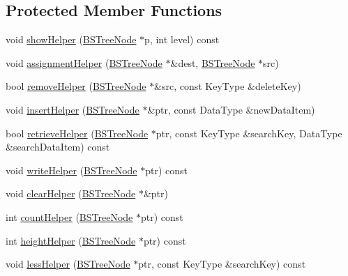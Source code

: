 \subsection*{\-Protected \-Member \-Functions}
\begin{DoxyCompactItemize}
\item 
void \hyperlink{class_b_s_tree_a44b3002e3476eb410468a4b9aaaa73ef}{show\-Helper} (\hyperlink{class_b_s_tree_1_1_b_s_tree_node}{\-B\-S\-Tree\-Node} $\ast$p, int level) const 
\item 
void \hyperlink{class_b_s_tree_aa0723f656b301d41e727f385d2ba2972}{assignment\-Helper} (\hyperlink{class_b_s_tree_1_1_b_s_tree_node}{\-B\-S\-Tree\-Node} $\ast$\&dest, \hyperlink{class_b_s_tree_1_1_b_s_tree_node}{\-B\-S\-Tree\-Node} $\ast$src)
\item 
bool \hyperlink{class_b_s_tree_ae6ebc1c4b8b1bba3f5e72f8d3700c79f}{remove\-Helper} (\hyperlink{class_b_s_tree_1_1_b_s_tree_node}{\-B\-S\-Tree\-Node} $\ast$\&src, const \-Key\-Type \&delete\-Key)
\item 
void \hyperlink{class_b_s_tree_ab3d09c9969cce52974a4a65e00202061}{insert\-Helper} (\hyperlink{class_b_s_tree_1_1_b_s_tree_node}{\-B\-S\-Tree\-Node} $\ast$\&ptr, const \-Data\-Type \&new\-Data\-Item)
\item 
bool \hyperlink{class_b_s_tree_ad558bd869107eec627a5015e8361275b}{retrieve\-Helper} (\hyperlink{class_b_s_tree_1_1_b_s_tree_node}{\-B\-S\-Tree\-Node} $\ast$ptr, const \-Key\-Type \&search\-Key, \-Data\-Type \&search\-Data\-Item) const 
\item 
void \hyperlink{class_b_s_tree_a55a1dafcd5a629264fe329a47ceabf4f}{write\-Helper} (\hyperlink{class_b_s_tree_1_1_b_s_tree_node}{\-B\-S\-Tree\-Node} $\ast$ptr) const 
\item 
void \hyperlink{class_b_s_tree_a1ede33f8cbe9d1d94b479b477d95d016}{clear\-Helper} (\hyperlink{class_b_s_tree_1_1_b_s_tree_node}{\-B\-S\-Tree\-Node} $\ast$\&ptr)
\item 
int \hyperlink{class_b_s_tree_a1e5f83d364cd403d5c548e46d2b665bf}{count\-Helper} (\hyperlink{class_b_s_tree_1_1_b_s_tree_node}{\-B\-S\-Tree\-Node} $\ast$ptr) const 
\item 
int \hyperlink{class_b_s_tree_a38df91c5e55a3b39f4590ee15f375f22}{height\-Helper} (\hyperlink{class_b_s_tree_1_1_b_s_tree_node}{\-B\-S\-Tree\-Node} $\ast$ptr) const 
\item 
void \hyperlink{class_b_s_tree_a0e560eccf958fc8c7e0e63a1b9dcd6a9}{less\-Helper} (\hyperlink{class_b_s_tree_1_1_b_s_tree_node}{\-B\-S\-Tree\-Node} $\ast$ptr, const \-Key\-Type \&search\-Key) const 
\end{DoxyCompactItemize}
